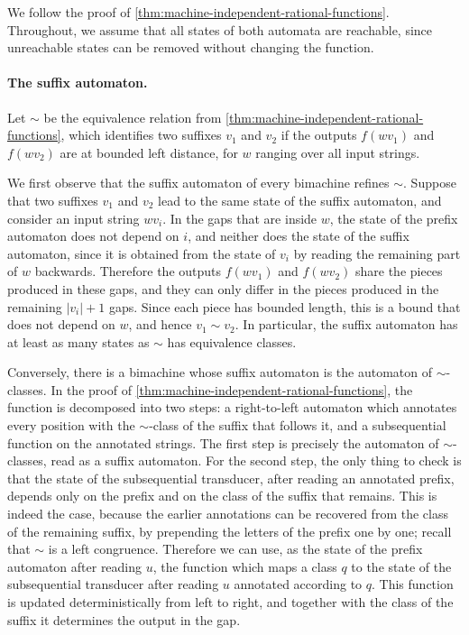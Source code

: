 {
    We follow the proof of \cref{thm:machine-independent-rational-functions}. Throughout, we assume that all states of both automata are reachable, since unreachable states can be removed without changing the function.

    \paragraph*{The suffix automaton.} Let $\sim$ be the equivalence relation from \cref{thm:machine-independent-rational-functions}, which identifies two suffixes $v_1$ and $v_2$ if the outputs $f(wv_1)$ and $f(wv_2)$ are at bounded left distance, for $w$ ranging over all input strings.

    We first observe that the suffix automaton of every bimachine refines $\sim$. Suppose that two suffixes $v_1$ and $v_2$ lead to the same state of the suffix automaton, and consider an input string $wv_i$. In the gaps that are inside $w$, the state of the prefix automaton does not depend on $i$, and neither does the state of the suffix automaton, since it is obtained from the state of $v_i$ by reading the remaining part of $w$ backwards. Therefore the outputs $f(wv_1)$ and $f(wv_2)$ share the pieces produced in these gaps, and they can only differ in the pieces produced in the remaining $|v_i|+1$ gaps. Since each piece has bounded length, this is a bound that does not depend on $w$, and hence $v_1 \sim v_2$. In particular, the suffix automaton has at least as many states as $\sim$ has equivalence classes.

    Conversely, there is a bimachine whose suffix automaton is the automaton of $\sim$-classes.  In the proof of \cref{thm:machine-independent-rational-functions}, the function is decomposed into two steps: a right-to-left automaton which annotates every position with the $\sim$-class of the suffix that follows it, and a subsequential function on the annotated strings. The first step is precisely the automaton of $\sim$-classes, read as a suffix automaton. For the second step, the only thing to check is that the state of the subsequential transducer, after reading an annotated prefix, depends only on the prefix and on the class of the suffix that remains. This is indeed the case, because the earlier annotations can be recovered from the class of the remaining suffix, by prepending the letters of the prefix one by one; recall that $\sim$ is a left congruence. Therefore we can use, as the state of the prefix automaton after reading $u$, the function which maps a class $q$ to the state of the subsequential transducer after reading $u$ annotated according to $q$. This function is updated deterministically from left to right, and together with the class of the suffix it determines the output in the gap.

}
